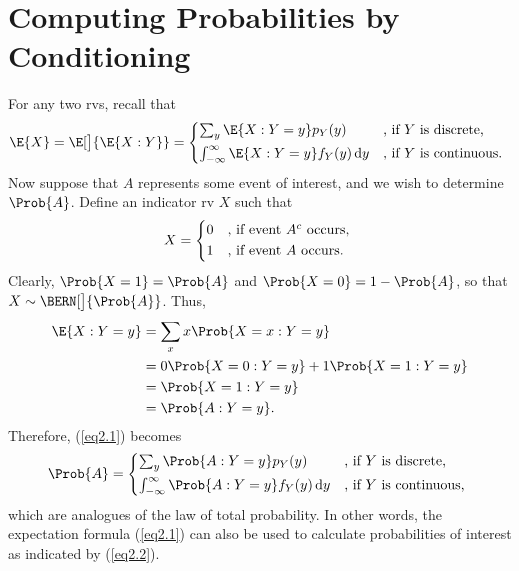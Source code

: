 \section{Computing Probabilities by Conditioning}
\begin{Regular}{}
    For any two rvs, recall that
    \begin{equation}
        \E{X}=\E[\big]{\E{X\given Y}}=\begin{cases*}
            \sum_y\E{X\given Y=y}p_Y(y)                          & , if $ Y $ is discrete,   \\
            \int_{-\infty}^{\infty}\E{X\given Y=y}f_Y(y)\odif{y} & , if $ Y $ is continuous.
        \end{cases*}\label{eq2.1}
    \end{equation}
    Now suppose that $ A $ represents some event of interest, and we wish to determine $ \Prob{A} $.
    Define an indicator rv $ X $ such that
    \[ X=\begin{cases*}
            0 & , if event $ A^c $ occurs, \\
            1 & , if event $ A $ occurs.
        \end{cases*} \]
    Clearly, $ \Prob{X=1}=\Prob{A} $ and $ \Prob{X=0}=1-\Prob{A} $, so that $ X \sim \BERN[\big]{\Prob{A}} $. Thus,
    \begin{align*}
        \E{X\given Y=y}
         & =\sum_x x\Prob{X=x\given Y=y}                \\
         & =0\Prob{X=0\given Y=y}+1\Prob{X=1\given Y=y} \\
         & =\Prob{X=1\given Y=y}                        \\
         & =\Prob{A\given Y=y}.
    \end{align*}
    Therefore, (\ref{eq2.1}) becomes
    \begin{equation}
        \Prob{A}=\begin{cases*}
            \sum_y\Prob{A\given Y=y}p_Y(y)                          & , if $ Y $ is discrete,   \\
            \int_{-\infty}^{\infty}\Prob{A\given Y=y}f_Y(y)\odif{y} & , if $ Y $ is continuous,
        \end{cases*}\label{eq2.2}
    \end{equation}
    which are analogues of the law of total probability. In other words, the expectation formula (\ref{eq2.1})
    can also be used to calculate probabilities of interest as indicated by (\ref{eq2.2}).
\end{Regular}
